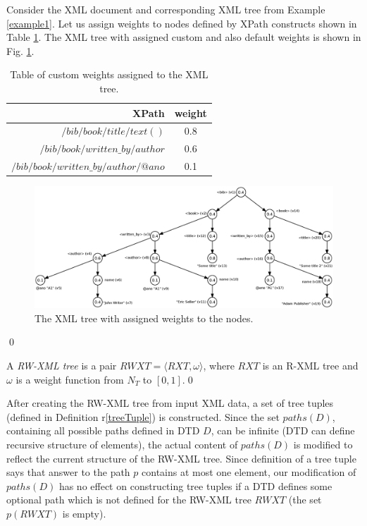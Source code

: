 \begin{example}
Consider the XML document and corresponding XML tree from Example \ref{example1}. Let us assign weights to nodes defined by XPath constructs shown in Table \ref{weightTab}. The XML tree with assigned custom and also default weights is shown in Fig. \ref{weightsFig}.

\begin{table}[h]
\begin{tabular}{r | c}
XPath & weight\\\hline
$/bib/book/title/text()$ & 0.8\\
$/bib/book/written\_by/author$ & 0.6\\
$/bib/book/written\_by/author/@ano$ & 0.1\\
\end{tabular}
\caption{Table of custom weights assigned to the XML tree.}
\label{weightTab}
\end{table}

\begin{figure}[H]
    \centering\includegraphics[width=\textwidth]{weights}
	\caption{The XML tree with assigned weights to the nodes.} \label{weightsFig}
\end{figure}
\qed
\end{example}


\begin{define}
A {\sl RW-XML tree} is a pair $RWXT = \langle RXT, \omega \rangle$, where $RXT$ is an R-XML tree and $\omega$ is a weight function from $N_T$ to $[0,1]$.\qed
\end{define}

After creating the RW-XML tree from input XML data, a set of tree tuples (defined in Definition r\ref{treeTuple}) is constructed. Since the set $paths(D)$, containing all possible paths defined in DTD $D$, can be infinite (DTD can define recursive structure of elements), the actual content of $paths(D)$ is modified to reflect the current structure of the RW-XML tree. Since definition of a tree tuple says that answer to the path $p$ contains at most one element, our modification of $paths(D)$ has no effect on constructing tree tuples if a DTD defines some optional path which is not defined for the RW-XML tree $RWXT$ (the set $p(RWXT)$ is empty).

